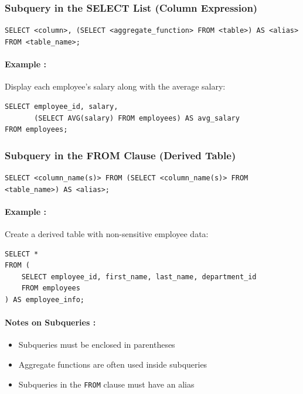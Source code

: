 \documentclass{article}
\begin{document}
\subsubsection{Subquery in the SELECT List (Column Expression)}

\begin{FormulaBox}
\texttt{SELECT <column>, (SELECT <aggregate\_function> FROM <table>) AS <alias>
FROM <table\_name>;}
\end{FormulaBox}

\paragraph{Example :}
Display each employee's salary along with the average salary:
\begin{verbatim}
SELECT employee_id, salary,
       (SELECT AVG(salary) FROM employees) AS avg_salary
FROM employees;
\end{verbatim}

\subsubsection{Subquery in the FROM Clause (Derived Table)}

\begin{FormulaBox}
\texttt{SELECT <column\_name(s)>
FROM (SELECT <column\_name(s)> FROM <table\_name>) AS <alias>;}
\end{FormulaBox}

\paragraph{Example :}
Create a derived table with non-sensitive employee data:
\begin{verbatim}
SELECT *
FROM (
    SELECT employee_id, first_name, last_name, department_id
    FROM employees
) AS employee_info;
\end{verbatim}

\paragraph{Notes on Subqueries :}

\begin{itemize}
    \item Subqueries must be enclosed in parentheses
    \item Aggregate functions are often used inside subqueries
    \item Subqueries in the \texttt{FROM} clause must have an alias
\end{itemize}
\end{document}
